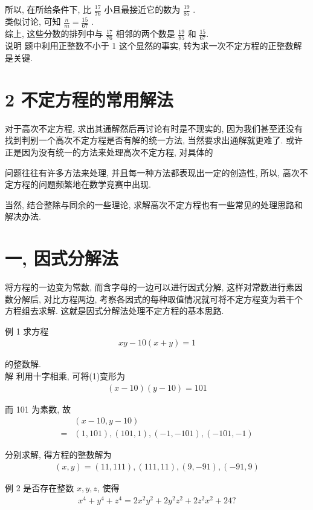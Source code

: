 	所以, 在所给条件下, 比 $\frac{17}{76}$ 小且最接近它的数为 $\frac{19}{85}$ . \\
	类似讨论, 可知 $\frac{n}{m}=\frac{15}{67}$ . \\
	综上, 这些分数的排列中与 $\frac{17}{76}$ 相邻的两个数是 $\frac{19}{85}$ 和 $\frac{15}{67}$.\\
	说明 题中利用正整数不小于 1 这个显然的事实, 转为求一次不定方程的正整数解是关键.

	\section{2 不定方程的常用解法}
	对于高次不定方程, 求出其通解然后再讨论有时是不现实的, 因为我们甚至还没有找到判别一个高次不定方程是否有解的统一方法, 当然要求出通解就更难了. 或许正是因为没有统一的方法来处理高次不定方程, 对具体的

	问题往往有许多方法来处理, 并且每一种方法都表现出一定的创造性, 所以, 高次不定方程的问题频繁地在数学竞赛中出现.

	当然, 结合整除与同余的一些理论, 求解高次不定方程也有一些常见的处理思路和解决办法.

	\section{一, 因式分解法}
	将方程的一边变为常数, 而含字母的一边可以进行因式分解, 这样对常数进行素因数分解后, 对比方程两边, 考察各因式的每种取值情况就可将不定方程变为若干个方程组去求解. 这就是因式分解法处理不定方程的基本思路.

	例 1 求方程
\begin{align*}
		x y-10(x+y)=1
	\end{align*}

	的整数解.\\
	解 利用十字相乘, 可将(1)变形为
\begin{align*}
		(x-10)(y-10)=101
	\end{align*}

	而 101 为素数, 故\begin{align}
		  & (x-10, y-10)                        \\
		= & (1,101),(101,1),(-1,-101),(-101,-1)
	\end{align}

	分别求解, 得方程的整数解为
\begin{align*}
		(x, y)=(11,111),(111,11),(9,-91),(-91,9)
	\end{align*}

	例 2 是否存在整数 $x ,  y ,  z$, 使得
\begin{align*}
		x^{4}+y^{4}+z^{4}=2 x^{2} y^{2}+2 y^{2} z^{2}+2 z^{2} x^{2}+24 ?
	\end{align*}

